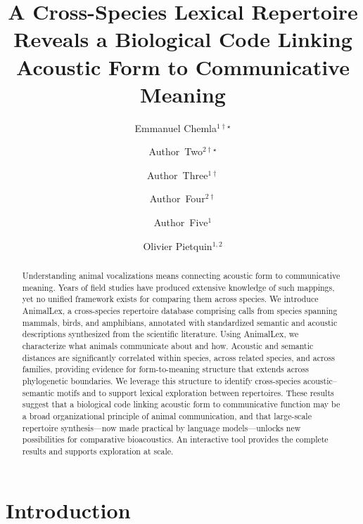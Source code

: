\documentclass[external]{esp-paper}
\title{A Cross-Species Lexical Repertoire Reveals a Biological Code Linking Acoustic Form to Communicative Meaning}
\author{Emmanuel Chemla$^{1\dagger\star}$}
\author{Author~Two$^{2\dagger\star}$}
\author{Author~Three$^{1\dagger}$}
\author{Author~Four$^{2\dagger}$}
\author{\authorcr Author~Five$^{1}$}
\author{Olivier Pietquin$^{1,2}$}
\affil{$^1$Earth Species Project}
\affil{$^2$External Institution}
\newcommand{\dbname}{AnimalLex\xspace}
\begin{document}
\thispagestyle{firstpage}
\maketitle

\begingroup
\def\thefootnote{$\star$}
\def\thefootnote{$\dagger$}
\def\thefootnote{\arabic{footnote}}
\endgroup

\begin{abstract}
	Understanding animal vocalizations means connecting acoustic form to communicative meaning. Years of field studies have produced extensive knowledge of such mappings, yet no unified framework exists for comparing them across species. We introduce \dbname, a cross-species repertoire database comprising \ncalls calls from \nspecies species spanning mammals, birds, and amphibians, annotated with standardized semantic and acoustic descriptions synthesized from the scientific literature. Using \dbname, we characterize what animals communicate about and how. Acoustic and semantic distances are significantly correlated within species, across related species, and across families, providing evidence for form-to-meaning structure that extends across phylogenetic boundaries. We leverage this structure to identify cross-species acoustic--semantic motifs and to support lexical exploration between repertoires. These results suggest that a biological code linking acoustic form to communicative function may be a broad organizational principle of animal communication, and that large-scale repertoire synthesis---now made practical by language models---unlocks new possibilities for comparative bioacoustics. An interactive tool provides the complete results and supports exploration at scale.
\end{abstract}

\section{Introduction}
\end{document}
